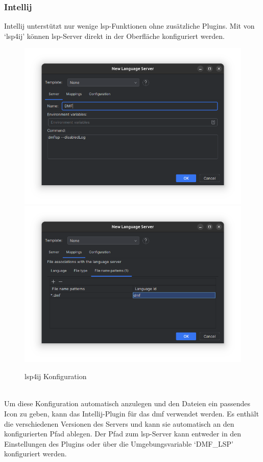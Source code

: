 \documentclass[./einleitung.tex]{subfiles}
\begin{document}
    \subsubsection{Intellij}
    Intellij unterstützt nur wenige \acrshort{lsp}-Funktionen ohne zusätzliche Plugins.
    Mit von `lsp4ij' können \acrshort{lsp}-Server direkt in der Oberfläche konfiguriert werden.\\
    \begin{figure}[H]
        \includegraphics[width=\linewidth / 2]{bilder/screenshot-add-lsp-lsp4ij}
        \includegraphics[width=\linewidth / 2]{bilder/screenshot-file-mapping}
        \caption{lsp4ij Konfiguration}
        \label{fig:screenshot-add-lsp-lsp4ij}
    \end{figure}\\
    Um diese Konfiguration automatisch anzulegen und den Dateien ein passendes Icon zu geben, kann das Intellij-Plugin für das \acrshort{dmf} verwendet werden.
    Es enthält die verschiedenen Versionen des Servers und kann sie automatisch an den konfigurierten Pfad ablegen.
    Der Pfad zum \acrshort{lsp}-Server kann entweder in den Einstellungen des Plugins oder über die Umgebungsvariable `DMF\_LSP' konfiguriert werden.
\end{document}
